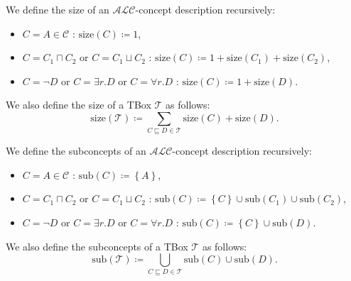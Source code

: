 \begin{mdframed}[frametitle={Sizes in $\mathcal{ALC}$}]
	We define the size of an $\mathcal{ALC}$-concept description recursively:
	\begin{itemize}
		\item $C = A \in \mathscr{C}$ : $\text{size}(C) \coloneqq 1$,
		\item $C = C_1 \sqcap C_2$ or $C = C_1 \sqcup C_2$ : $\text{size}(C) \coloneqq 1 + \text{size}(C_1) + \text{size}(C_2)$,
		\item $C = \neg D$ or $C = \exists r.D$ or $C = \forall r.D$ : $\text{size}(C) \coloneqq 1 + \text{size}(D)$.
	\end{itemize}
	We also define the size of a TBox $\mathcal{T}$ as follows:
	\[
		\text{size}(\mathcal{T}) \coloneqq \sum_{C \sqsubseteq D \in \mathcal{T}} \text{size}(C) + \text{size}(D)
	.\]
\end{mdframed}

\begin{mdframed}[frametitle={Subconcepts in $\mathcal{ALC}$}]
	We define the subconcepts of an $\mathcal{ALC}$-concept description recursively:
	\begin{itemize}
		\item $C = A \in \mathscr{C}$ : $\text{sub}(C) \coloneqq \left\{ A \right\}$,
		\item $C = C_1 \sqcap C_2$ or $C = C_1 \sqcup C_2$ : $\text{sub}(C) \coloneqq \left\{ C \right\} \cup \text{sub}(C_1) \cup \text{sub}(C_2)$,
		\item $C = \neg D$ or $C = \exists r.D$ or $C = \forall r.D$ : $\text{sub}(C) \coloneqq \left\{ C \right\} \cup \text{sub}(D)$.
	\end{itemize}
	We also define the subconcepts of a TBox $\mathcal{T}$ as follows:
	\[
		\text{sub}(\mathcal{T}) \coloneqq \bigcup_{C \sqsubseteq D \in \mathcal{T}} \text{sub}(C) \cup \text{sub}(D)
	.\]
\end{mdframed}
